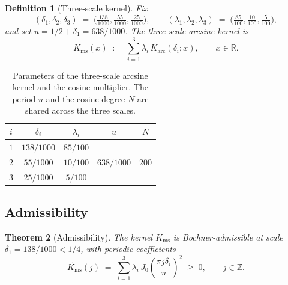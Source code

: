 \documentclass[11pt, letterpaper]{article}
\theoremstyle{paperplain}
\newtheorem{theorem}{Theorem}[section]
\theoremstyle{paperdef}
\newtheorem{definition}[theorem]{Definition}
\newcommand{\R}{\mathbb{R}}
\newcommand{\Z}{\mathbb{Z}}
\newcommand{\Karc}{K_{\mathrm{arc}}}
\newcommand{\Kms}{K_{\mathrm{ms}}}
\begin{document}
\begin{definition}[Three-scale kernel]
\label{def:Kms}
Fix
\begin{equation}\label{eq:anchors}
  (\delta_1,\delta_2,\delta_3)
  \;=\;
  \bigl(\tfrac{138}{1000},\tfrac{55}{1000},\tfrac{25}{1000}\bigr),
  \qquad
  (\lambda_1,\lambda_2,\lambda_3)
  \;=\;
  \bigl(\tfrac{85}{100},\tfrac{10}{100},\tfrac{5}{100}\bigr),
\end{equation}
and set $u=1/2+\delta_1=638/1000$.  The
\emph{three-scale arcsine kernel} is
\[
  \Kms(x)
  \;:=\;
  \sum_{i=1}^{3}\lambda_i\,\Karc(\delta_i;x),
  \qquad x\in\R.
\]
\end{definition}

\begin{table}[ht]
\centering
\begin{tabular}{ccccc}
  \toprule
  $i$ & $\delta_i$ & $\lambda_i$ & $u$ & $N$ \\
  \midrule
  $1$ & $138/1000$ & $85/100$ & \multirow{3}{*}{$638/1000$} & \multirow{3}{*}{$200$} \\
  $2$ & $55/1000$  & $10/100$ & & \\
  $3$ & $25/1000$  & $5/100$  & & \\
  \bottomrule
\end{tabular}
\caption[Parameters of the three-scale arcsine kernel and the cosine multiplier.]{Parameters of the three-scale arcsine kernel and the cosine
multiplier.  The period $u$ and the cosine degree $N$ are shared
across the three scales.}
\label{tab:kernel-params}
\end{table}

\subsection{Admissibility}\label{subsec:kernel-admissibility}

\begin{theorem}[Admissibility]
\label{thm:admissibility}
The kernel $\Kms$ is Bochner-admissible at scale
$\delta_1=138/1000<1/4$, with periodic coefficients
\begin{equation}\label{eq:Ktilde}
  \widetilde{\Kms}(j)
  \;=\;
  \sum_{i=1}^{3}\lambda_i\,
       J_0\!\left(\frac{\pi j\delta_i}{u}\right)^{\!2}
  \;\ge\; 0,
  \qquad j\in\Z.
\end{equation}
\end{theorem}
\end{document}

